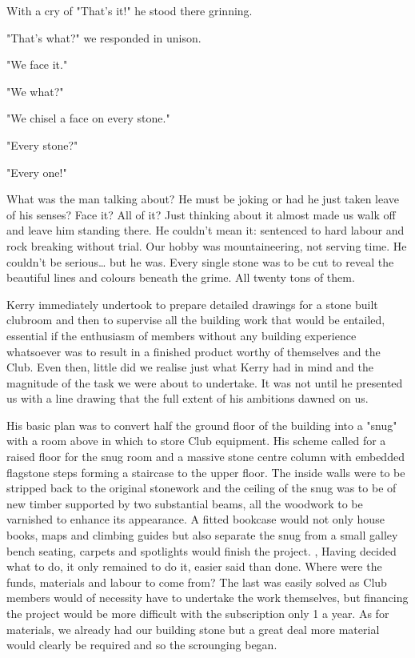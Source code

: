 \documentclass[a5paper,openany,font 10pt]{scrbook}
\begin{document}
With a cry of "That's it!" he stood there grinning.

"That's what?" we responded in unison.

"We face it."

"We what?"

"We chisel a face on every stone."

"Every stone?"

"Every one!"

What was the man talking about? He must be joking  or had he
just taken leave of his senses? Face it? All of it? Just thinking
about it almost made us walk off and leave him standing there. He
couldn't mean it: sentenced to hard labour and rock breaking
without trial. Our hobby was mountaineering, not serving time. He
couldn't be serious\ldots{} but he was. Every single stone was to be
cut to reveal the beautiful lines and colours beneath the grime.
All twenty tons of them.

Kerry immediately undertook to prepare detailed drawings for
a stone built clubroom and then to supervise all the building
work that would be entailed, essential if the enthusiasm of
members without any building experience whatsoever was to result
in a finished product worthy of themselves and the Club. Even
then, little did we realise just what Kerry had in mind and the
magnitude of the task we were about to undertake. It was not
until he presented us with a line drawing that the full extent of
his ambitions dawned on us.

His basic plan was to convert half the ground floor of the
building into a "snug" with a room above in which to store Club
equipment. His scheme called for a raised floor for the snug room
and a massive stone centre column with embedded flagstone steps
forming a staircase to the upper floor. The inside walls were to
be stripped back to the original stonework and the ceiling of the
snug was to be of new timber supported by two substantial beams,
all the woodwork to be varnished to enhance its appearance. A
fitted bookcase would not only house books, maps and climbing
guides but also separate the snug from a small galley  bench
seating, carpets and spotlights would finish the project. ,
Having decided what to do, it only remained to do it, easier
said than done. Where were the funds, materials and labour to
come from? The last was easily solved as Club members would of
necessity have to undertake the work themselves, but financing
the project would be  more difficult with the subscription only
 1 a year. As for materials, we already had our building stone
but a great deal more material would clearly be required and so
the scrounging began.
\end{document}
